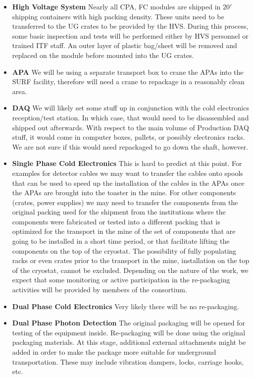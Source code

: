 \begin{itemize}
  \item {\bf High Voltage System} Nearly all CPA, FC modules are
    shipped in $20'$ shipping containers with high packing density.
    These units need to be transferred to the UG crates to be provided
    by the HVS.  During this process, some basic inspection and tests
    will be performed either by HVS personnel or trained ITF staff.
    An outer layer of plastic bag/sheet will be removed and replaced
    on the module before mounted into the UG crates.
  \item {\bf APA} We will be using a separate transport box to crane
    the APAs into the SURF facility, therefore will need a crane to
    repackage in a reasonably clean area.
  \item {\bf DAQ} We will likely set some stuff up in conjunction with
    the cold electronics reception/test station.  In which case, that
    would need to be disassembled and shipped out afterwards.  With
    respect to the main volume of Production DAQ stuff, it would come
    in computer boxes, pallets, or possibly electronics racks.  We are
    not sure if this would need repackaged to go down the shaft,
    however.
  \item {\bf Single Phase Cold Electronics} This is hard to predict at
    this point. For examples for detector cables we may want to
    transfer the cables onto spools that can be used to speed up the
    installation of the cables in the APAs once the APAs are brought
    into the toaster in the mine. For other components (crates, power
    supplies) we may need to transfer the components from the original
    packing used for the shipment from the institutions where the
    components were fabricated or tested into a different packing that
    is optimized for the transport in the mine of the set of
    components that are going to be installed in a short time period,
    or that facilitate lifting the components on the top of the
    cryostat. The possibility of fully populating racks or even crates
    prior to the transport in the mine, installation on the top of the
    cryostat, cannot be excluded. Depending on the nature of the work,
    we expect that some monitoring or active participation in the
    re-packaging activities will be provided by members of the
    consortium.
   \item {\bf Dual Phase Cold Electronics} Very likely there will be
     no re-packaging.
   \item {\bf Dual Phase Photon Detection} The original packaging will
     be opened for testing of the equipment inside. Re-packaging will
     be done using the original packaging materials. At this stage,
     additional external attachments might be added in order to make
     the package more suitable for underground transportation. These
     may include vibration dampers, locks, carriage hooks, etc.
\end{itemize}

